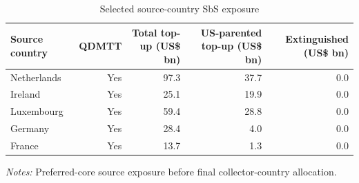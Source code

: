 \begin{table}[H]
\centering
\footnotesize
\setlength{\tabcolsep}{3pt}
\caption{Selected source-country SbS exposure}
\label{tab:app_stage45_sbs_source_exposure}
\begin{tabular}{@{}lrrrr@{}}
\toprule
Source country & QDMTT & Total top-up (US\$ bn) & US-parented top-up (US\$ bn) & Extinguished (US\$ bn) \\
\midrule
Netherlands & Yes & 97.3 & 37.7 & 0.0 \\
Ireland & Yes & 25.1 & 19.9 & 0.0 \\
Luxembourg & Yes & 59.4 & 28.8 & 0.0 \\
Germany & Yes & 28.4 &  4.0 & 0.0 \\
France & Yes & 13.7 &  1.3 & 0.0 \\
\bottomrule
\end{tabular}

\vspace{0.35em}
\noindent\begin{minipage}{\textwidth}
\footnotesize\raggedright\textit{Notes:} Preferred-core source exposure before final collector-country allocation.
\end{minipage}
\end{table}
